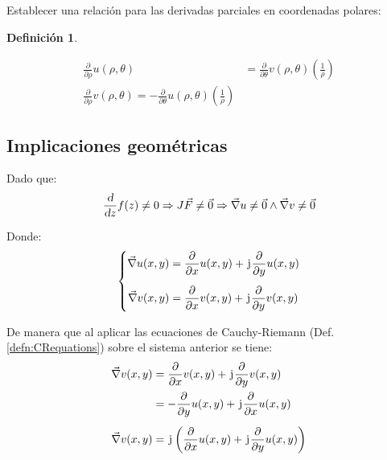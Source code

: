 \documentclass[a5paper,12pt,twoside]{book}
\newtheorem{defn}{{Definición}}[chapter]
\begin{document}
Establecer una relación para las derivadas parciales en coordenadas polares:

\begin{mdframed}[style=DefinitionFrame]
    \begin{defn}
        \label{defn:CRpolarEquations}
    \end{defn}
    \begin{align*}
        \frac{\partial}{\partial \rho} u(\rho,\theta) &= \frac{\partial}{\partial \theta}  v(\rho,\theta) \left( \frac{1}{\rho} \right)
        \\[1em]
        \frac{\partial}{\partial \rho} v(\rho,\theta) = - \frac{\partial}{\partial \theta} u(\rho,\theta) \left( \frac{1}{\rho} \right)
    \end{align*}
\end{mdframed}


\subsection{Implicaciones geométricas}

Dado que:
\begin{equation*}
    \frac{\textsl{d}}{\textsl{d} z} f(z) \neq 0 \Rightarrow  J \Vec{F} \neq \Vec{0} \Rightarrow \Vec{\nabla} u \neq \Vec{0} \land \Vec{\nabla} v \neq \Vec{0}
\end{equation*}

Donde:
\begin{equation*}
    \left\{
    \begin{aligned}
        \Vec{\nabla} u(x,y) &= \frac{\partial}{\partial x} u(x,y) + \mkern2mu\mathrm{j}\mkern1mu \frac{\partial}{\partial y} u(x,y)
        \\[1ex]
        \Vec{\nabla} v(x,y) &= \frac{\partial}{\partial x} v(x,y) + \mkern2mu\mathrm{j}\mkern1mu \frac{\partial}{\partial y} v(x,y)
    \end{aligned}
    \right.
\end{equation*}

De manera que al aplicar las ecuaciones de Cauchy-Riemann (Def. \ref{defn:CRequations}) sobre el sistema anterior se tiene:
\begin{align*}
    \Vec{\nabla} v(x,y) &= \frac{\partial}{\partial x} v(x,y) + \mkern2mu\mathrm{j}\mkern1mu \frac{\partial}{\partial y} v(x,y)
    \\
    &= - \frac{\partial}{\partial y} u(x,y) + \mkern2mu\mathrm{j}\mkern1mu \frac{\partial}{\partial x} u(x,y)
    \\[1ex]
    \Vec{\nabla} v(x,y) &= \mkern2mu\mathrm{j}\mkern1mu \left( \frac{\partial}{\partial x} u(x,y) + \mkern2mu\mathrm{j}\mkern1mu \frac{\partial}{\partial y} u(x,y) \right)
\end{align*}
\end{document}
